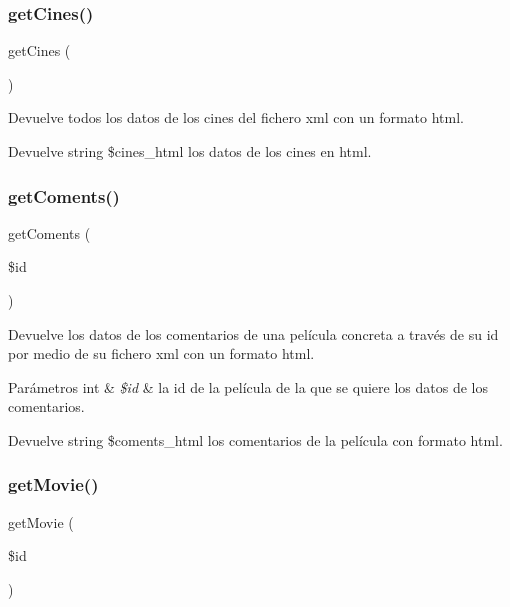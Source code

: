 \subsubsection{\texorpdfstring{getCines()}{getCines()}}
{\footnotesize\ttfamily get\+Cines (\begin{DoxyParamCaption}{ }\end{DoxyParamCaption})}

Devuelve todos los datos de los cines del fichero xml con un formato html.

\begin{DoxyReturn}{Devuelve}
string \$cines\+\_\+html los datos de los cines en html. 
\end{DoxyReturn}
\mbox{\label{server_manager_8php_a165bd4fb886e760759845a26ed7d1c2f}} 
\subsubsection{\texorpdfstring{getComents()}{getComents()}}
{\footnotesize\ttfamily get\+Coments (\begin{DoxyParamCaption}\item[{}]{\$id }\end{DoxyParamCaption})}

Devuelve los datos de los comentarios de una película concreta a través de su id por medio de su fichero xml con un formato html.


\begin{DoxyParams}[1]{Parámetros}
int & {\em \$id} & la id de la película de la que se quiere los datos de los comentarios.\\
\hline
\end{DoxyParams}
\begin{DoxyReturn}{Devuelve}
string \$coments\+\_\+html los comentarios de la película con formato html. 
\end{DoxyReturn}
\mbox{\label{server_manager_8php_a7b9eed7e71146a4086047f9eaaf59985}} 
\subsubsection{\texorpdfstring{getMovie()}{getMovie()}}
{\footnotesize\ttfamily get\+Movie (\begin{DoxyParamCaption}\item[{}]{\$id }\end{DoxyParamCaption})}

